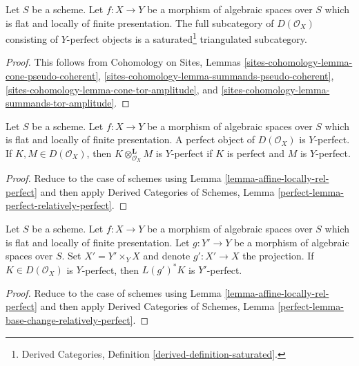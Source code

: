 \begin{lemma}
\label{lemma-triangulated}
Let $S$ be a scheme. Let $f : X \to Y$ be a morphism of
algebraic spaces over $S$ which is flat and locally of finite presentation.
The full subcategory of $D(\mathcal{O}_X)$ consisting of $Y$-perfect objects is
a saturated\footnote{Derived Categories, Definition
\ref{derived-definition-saturated}.} triangulated subcategory.
\end{lemma}

\begin{proof}
This follows from Cohomology on Sites, Lemmas
\ref{sites-cohomology-lemma-cone-pseudo-coherent},
\ref{sites-cohomology-lemma-summands-pseudo-coherent},
\ref{sites-cohomology-lemma-cone-tor-amplitude}, and
\ref{sites-cohomology-lemma-summands-tor-amplitude}.
\end{proof}

\begin{lemma}
\label{lemma-perfect-relatively-perfect}
Let $S$ be a scheme.
Let $f : X \to Y$ be a morphism of algebraic spaces over $S$
which is flat and locally of finite presentation.
A perfect object of $D(\mathcal{O}_X)$ is $Y$-perfect.
If $K, M \in D(\mathcal{O}_X)$, then $K \otimes_{\mathcal{O}_X}^\mathbf{L} M$
is $Y$-perfect if $K$ is perfect and $M$ is $Y$-perfect.
\end{lemma}

\begin{proof}
Reduce to the case of schemes using
Lemma \ref{lemma-affine-locally-rel-perfect}
and then apply
Derived Categories of Schemes, Lemma
\ref{perfect-lemma-perfect-relatively-perfect}.
\end{proof}

\begin{lemma}
\label{lemma-base-change-relatively-perfect}
Let $S$ be a scheme.
Let $f : X \to Y$ be a morphism of algebraic spaces over $S$
which is flat and locally of finite presentation.
Let $g : Y' \to Y$ be a morphism of algebraic spaces over $S$.
Set $X' = Y' \times_Y X$ and denote $g' : X' \to X$ the projection.
If $K \in D(\mathcal{O}_X)$ is $Y$-perfect, then $L(g')^*K$
is $Y'$-perfect.
\end{lemma}

\begin{proof}
Reduce to the case of schemes using
Lemma \ref{lemma-affine-locally-rel-perfect}
and then apply
Derived Categories of Schemes, Lemma
\ref{perfect-lemma-base-change-relatively-perfect}.
\end{proof}

